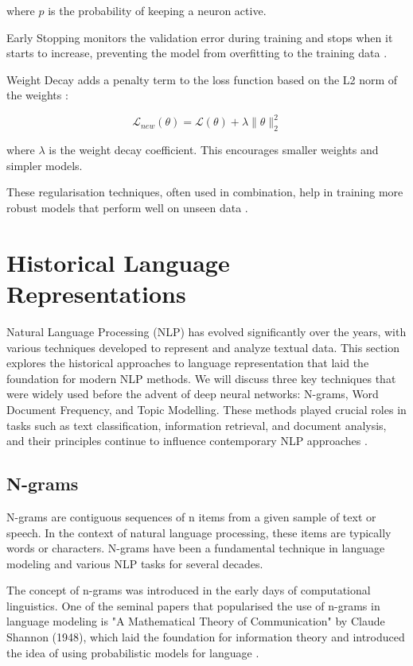 \documentclass[a4paper, oneside]{discothesis}
\begin{document}
where $p$ is the probability of keeping a neuron active.

Early Stopping monitors the validation error during training and stops when it starts to increase, preventing the model from overfitting to the training data \cite{prechelt1998early}.

Weight Decay adds a penalty term to the loss function based on the L2 norm of the weights \cite{krogh1992simple}:

\begin{equation}
    \mathcal{L}_{new}(\theta) = \mathcal{L}(\theta) + \lambda \|\theta\|_2^2
\end{equation}

where $\lambda$ is the weight decay coefficient. This encourages smaller weights and simpler models.

These regularisation techniques, often used in combination, help in training more robust models that perform well on unseen data \cite{kukavcka2017regularization}.

\section{Historical Language Representations}

Natural Language Processing (NLP) has evolved significantly over the years, with various techniques developed to represent and analyze textual data. This section explores the historical approaches to language representation that laid the foundation for modern NLP methods. We will discuss three key techniques that were widely used before the advent of deep neural networks: N-grams, Word Document Frequency, and Topic Modelling. These methods played crucial roles in tasks such as text classification, information retrieval, and document analysis, and their principles continue to influence contemporary NLP approaches \cite{manning1999foundations}.

\subsection{N-grams}
N-grams are contiguous sequences of n items from a given sample of text or speech. In the context of natural language processing, these items are typically words or characters. N-grams have been a fundamental technique in language modeling and various NLP tasks for several decades.

The concept of n-grams was introduced in the early days of computational linguistics. One of the seminal papers that popularised the use of n-grams in language modeling is "A Mathematical Theory of Communication" by Claude Shannon (1948), which laid the foundation for information theory and introduced the idea of using probabilistic models for language \cite{shannon1948mathematical}.
\end{document}
